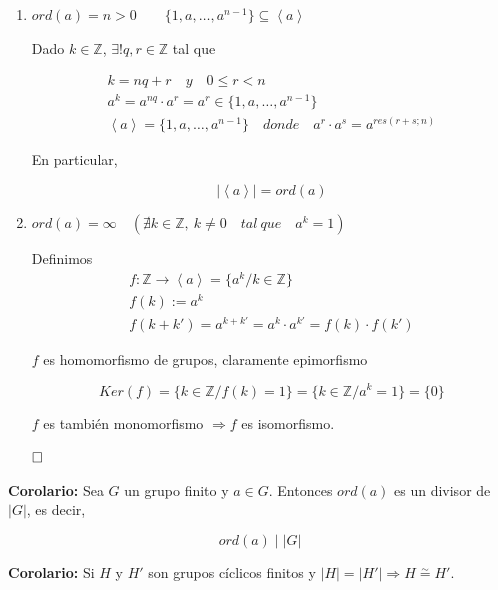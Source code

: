 \documentclass{article}
\begin{document}
\begin{enumerate}[(1)]
\item $ord(a)=n>0 \qquad \{1,a,\ldots,a^{n-1}\}\subseteq \left\langle a \right\rangle$

Dado $k \in \mathbb{Z}$, $\exists! q,r\in \mathbb{Z}$ tal que 

\begin{gather*}
k=nq+r \quad y \quad 0\leq r<n \\
a^k=a^{nq}\cdot a^r=a^r\in \{1,a,\ldots,a^{n-1}\} \\
\left\langle a \right\rangle=\{1,a,\ldots,a^{n-1}\} \quad donde \quad a^r\cdot a^s=a^{res(r+s;n)}
\end{gather*}

En particular,

\begin{equation*}
|\left\langle a \right\rangle|=ord(a)
\end{equation*}

\item $ord(a)=\infty \quad \left(\nexists k\in\mathbb{Z},\:k\neq 0 \quad tal\:que\quad a^k=1\right)$

Definimos 
\begin{gather*}
f:\mathbb{Z}\rightarrow \left\langle a\right\rangle=\{a^k/k\in \mathbb{Z}\} \\
f(k):=a^k \\
f(k+k')=a^{k+k'}=a^k\cdot a^{k'}=f(k)\cdot f(k')
\end{gather*}

$f$ es homomorfismo de grupos, claramente epimorfismo

\begin{equation*}
Ker(f)=\{k\in \mathbb{Z}/f(k)=1\}=\{k\in \mathbb{Z}/a^k=1\}=\{0\}
\end{equation*}

$f$ es también monomorfismo $\Rightarrow f$ es isomorfismo. 

$\hfill\square$ \\
\end{enumerate} 

\textbf{Corolario:} Sea $G$ un grupo finito y $a\in G$. Entonces $ord(a)$ es un divisor de $|G|$, es decir, 

\begin{equation*}
ord(a) \mid |G|
\end{equation*}

\textbf{Corolario:} Si $H$ y $H'$ son grupos cíclicos finitos y $|H|=|H'|\Rightarrow H \overset{\sim}{=} H'$. \\
\end{document}
